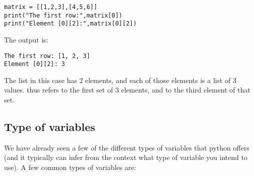 \begin{lstlisting}[frame=single] 
matrix = [[1,2,3],[4,5,6]]
print("The first row:",matrix[0])
print("Element [0][2]:",matrix[0][2])
\end{lstlisting}
The output is:
\begin{verbatim}
The first row: [1, 2, 3]
Element [0][2]: 3
\end{verbatim}
The  list in this case has 2 elements, and each of those elements is a list of 3 values.  thus refers to the first set of 3 elements, and  to the third element of that set. 

\subsection{Type of variables}
We have already seen a few of the different types of variables that python offers (and it typically can infer from the context what type of variable you intend to use). A few common types of variables are:
